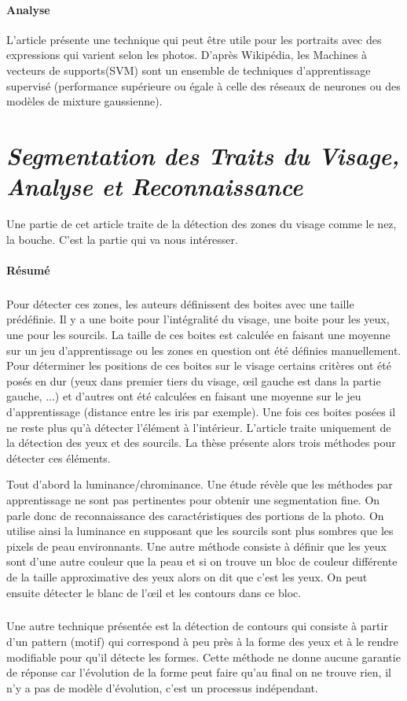 \documentclass[11pt, french]{report-rd-info}
\begin{document}
\paragraph{Analyse}
L’article présente une technique qui peut être utile pour les portraits avec des expressions qui varient selon les photos. D’après Wikipédia, les Machines à vecteurs de supports(SVM) sont un ensemble de techniques d'apprentissage supervisé (performance supérieure ou égale à celle des réseaux de neurones ou des modèles de mixture gaussienne).

\section{\emph{Segmentation des Traits du Visage, Analyse et Reconnaissance}}
Une partie de cet article\cite{Cognitives2006} traite de la détection des zones du visage comme le nez, la bouche. C'est la partie qui va nous intéresser.

\paragraph{Résumé}
\subparagraph{}
Pour détecter ces zones, les auteurs définissent des boites avec une taille prédéfinie. Il y a une boite pour l'intégralité du visage, une boite pour les yeux, une pour les sourcils. La taille de ces boites est calculée en faisant une moyenne sur un jeu d'apprentissage ou les zones en question ont été définies manuellement.
Pour déterminer les positions de ces boites sur le visage certains critères ont été posés en dur (yeux dans premier tiers du visage, œil gauche est dans la partie gauche, ...) et d'autres ont été calculées en faisant une moyenne sur le jeu d'apprentissage (distance entre les iris par exemple).
Une fois ces boites posées il ne reste plus qu'à détecter l'élément à l’intérieur.
L'article traite uniquement de la détection des yeux et des sourcils.
La thèse présente alors trois méthodes pour détecter ces éléments.

Tout d'abord la luminance/chrominance. Une étude révèle que les méthodes par apprentissage ne sont pas pertinentes pour obtenir une segmentation fine. On parle donc de reconnaissance des caractéristiques des portions de la photo. On utilise ainsi la luminance en supposant que les sourcils sont plus sombres que les pixels de peau environnants.
Une autre méthode consiste à définir que les yeux sont d'une autre couleur que la peau et si on trouve un bloc de couleur différente de la taille approximative des yeux alors on dit que c'est les yeux. On peut ensuite détecter le blanc de l'œil et les contours dans ce bloc.
\subparagraph{}
Une autre technique présentée est la détection de contours qui consiste à partir d'un pattern (motif) qui correspond à peu près à la forme des yeux et à le rendre modifiable pour qu'il détecte les formes. Cette méthode ne donne aucune garantie de réponse car l'évolution de la forme peut faire qu'au final on ne trouve rien, il n'y a pas de modèle d'évolution, c'est un processus indépendant.
\end{document}
